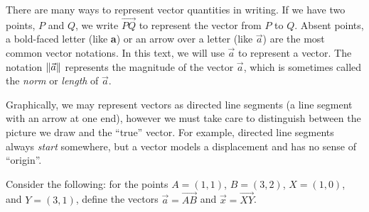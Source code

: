 \begin{center}
	\usetikzlibrary{patterns,decorations.pathreplacing}
\end{center}



There are many ways to represent vector quantities in writing.  If
we have two points, $P$ and $Q$, we write $\overrightarrow{PQ}$ to represent the
vector from $P$ to $Q$.  Absent points, a bold-faced letter (like {\bfseries a})
or an arrow over 
a letter (like $\vec a$) are the most common vector notations.
In this text, we will use $\vec a$ to represent a vector.
The notation $\lVert\vec a\rVert$\index{$\norm{\:\cdot\:}$}
represents the magnitude of the vector $\vec a$, which is sometimes called
the \emph{norm} or \emph{length} of $\vec a$.


Graphically, we may represent vectors as directed line segments (a
line segment with an arrow at one end), however we must take care to
distinguish between the picture we draw and the ``true'' vector.
For example, directed line segments always \emph{start} somewhere, but a vector
models a displacement and has no sense of ``origin''.

Consider the following: for the points $A=(1,1)$, $B=(3,2)$, $X=(1,0)$, and $Y=(3,1)$, define the vectors
$\vec a = \overrightarrow{AB}$ and $\vec x=\overrightarrow{XY}$.  


